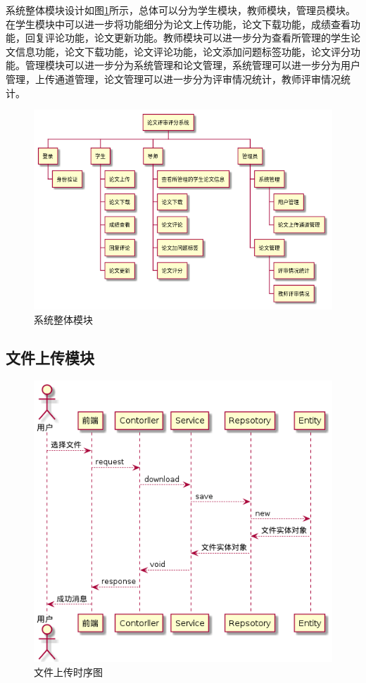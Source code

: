 系统整体模块设计如图\ref{system-wbs}所示，总体可以分为学生模块，教师模块，管理员模块。在学生模块中可以进一步将功能细分为论文上传功能，论文下载功能，成绩查看功能，回复评论功能，论文更新功能。教师模块可以进一步分为查看所管理的学生论文信息功能，论文下载功能，论文评论功能，论文添加问题标签功能，论文评分功能。管理模块可以进一步分为系统管理和论文管理，系统管理可以进一步分为用户管理，上传通道管理，论文管理可以进一步分为评审情况统计，教师评审情况统计。

\begin{figure}[htbp]
    \centering
    \includegraphics[scale = 0.6]{out/uml/WBS/系统WBS/系统WBS.png}
    \caption{\song\wuhao 系统整体模块}
    \label{system-wbs}
\end{figure}

\subsection{文件上传模块}

\begin{figure}[htbp]
    \centering
    \includegraphics[scale = 0.6]{out/uml/时序图/file-upload-sequence/file-upload-sequence.png}
    \caption{\song\wuhao 文件上传时序图}
    \label{file-upload-sequence}
\end{figure}

